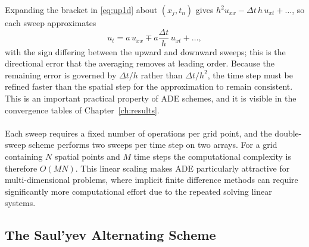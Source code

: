 \documentclass[12pt,a4paper]{article}
\begin{document}
Expanding the bracket in \eqref{eq:up1d} about $(x_j,t_n)$ gives $h^2u_{xx}-\Delta t\,h\,u_{xt}+\dots$, so each sweep approximates
\begin{equation}
u_t=a\,u_{xx}\mp a\frac{\Delta t}{h}\,u_{xt}+\dots,
\end{equation}
with the sign differing between the upward and downward sweeps; this is the directional error that the averaging removes at leading order. Because the remaining error is governed by $\Delta t/h$ rather than $\Delta t/h^2$, the time step must be refined faster than the spatial step for the approximation to remain consistent. This is an important practical property of ADE schemes, and it is visible in the convergence tables of Chapter~\ref{ch:results}.\\\\
Each sweep requires a fixed number of operations per grid point, and the double-sweep scheme performs two sweeps per time step on two arrays. For a grid containing $N$ spatial points and $M$ time steps the computational complexity is therefore $O(MN)$. This linear scaling makes ADE particularly attractive for multi-dimensional problems, where implicit finite difference methods can require significantly more computational effort due to the repeated solving linear systems.

\subsection{The Saul'yev Alternating Scheme}\label{sec:sauly}
\end{document}
